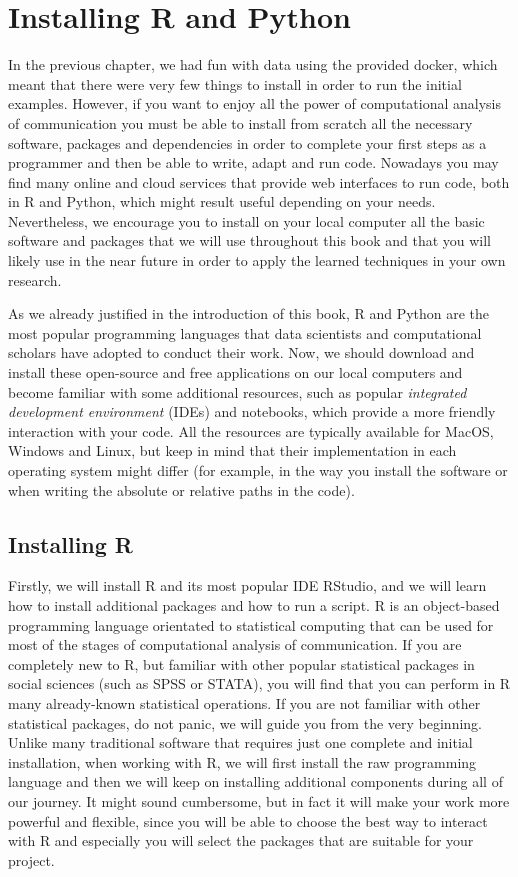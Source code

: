 \section{Installing R and Python}
\label{sec:installing}

In the previous chapter, we had fun with data using the provided
docker, which meant that there were very few things to install in
order to run the initial examples. However, if you want to enjoy all
the power of computational analysis of communication you must be able
to install from scratch all the necessary software, packages and
dependencies in order to complete your first steps as a programmer and
then be able to write, adapt and run code. Nowadays you may find many
online and cloud services that provide web interfaces to run code,
both in R and Python, which might result useful depending on your
needs. Nevertheless, we encourage you to install on your local
computer all the basic software and packages that we will use
throughout this book and that you will likely use in the near future
in order to apply the learned techniques in your own research.

As we already justified in the introduction of this book, R and Python
are the most popular programming languages that data scientists and
computational scholars have adopted to conduct their work.  Now, we
should download and install these open-source and free applications on
our local computers and become familiar with some additional
resources, such as popular \emph{integrated development environment}
(IDEs) and notebooks, which provide a more friendly interaction with
your code. All the resources are typically available for MacOS,
Windows and Linux, but keep in mind that their implementation in each
operating system might differ (for example, in the way you install the
software or when writing the absolute or relative paths in the code).


\subsection{Installing R}

Firstly, we will install R and its most popular IDE RStudio, and we
will learn how to install additional packages and how to run a
script. R is an object-based programming language
orientated to statistical computing that can be used for most of the
stages of computational analysis of communication.  If you are
completely new to R, but familiar with other popular
statistical packages in social sciences (such as SPSS or STATA), you
will find that you can perform in R many already-known statistical
operations. If you are not familiar with other statistical packages,
do not panic, we will guide you from the very beginning. Unlike
many traditional software that requires just one complete and initial
installation, when working with R, we will first install the raw
programming language and then we will keep on installing additional
components during all of our journey. It might sound cumbersome, but
in fact it will make your work more powerful and flexible, since you
will be able to choose the best way to interact with R and especially
you will select the packages that are suitable for your project.

